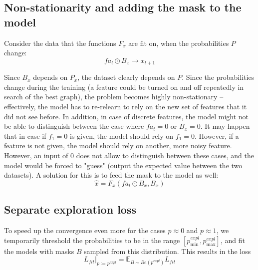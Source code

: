 \documentclass[a4paper,11pt,oneside]{report}
\begin{document}
\subsection{Non-stationarity and adding the mask to the model}
Consider the data that the functions $F_x$ are fit on, when the probabilities $P$ change:
$$
fa_t\odot B_x\to x_{t+1}
$$

Since $B_x$ depends on $P_x$, the dataset clearly depends on $P$. Since the probabilities change during the training (a feature could be turned on and off repeatedly in search of the best graph), the problem becomes highly non-stationary -- effectively, the model has to re-relearn to rely on the new set of features that it did not see before. In addition, in case of discrete features, the model might not be able to distinguish between the case where $fa_t=0$ or $B_x=0$.
It may happen that in case if $f_1=0$ is given, the model should rely on $f_1=0$. However, if a feature is not given, the model should rely on another, more noisy feature.
However, an input of $0$ does not allow to distinguish between these cases, and the model would be forced to "guess" (output the expected value between the two datasets).
A solution for this is to feed the mask to the model as well:
$$
\hat{x}=F_x(fa_t\odot B_x,B_x)
$$

\subsection{Separate exploration loss}
To speed up the convergence even more for the cases $p\approx 0$ and $p\approx 1$, we temporarily threshold the probabilities to be in the range $[p^{expl}_{\min},p^{expl}_{\max}]$, and fit the models with masks $B$ sampled from this distribution. This results in the loss
\begin{equation}
L_{fit}\big|_{p:=p^{expl}}=\mathbb E_{B\sim Be(p^{expl})} L_{fit}
\end{equation}
\end{document}
